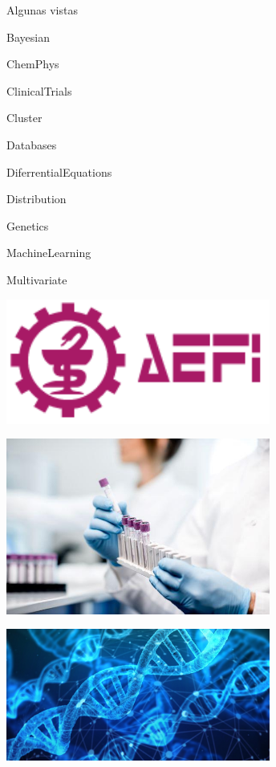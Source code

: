 \documentclass[xcolor=table]{beamer}
\begin{document}
\begin{frame}{Algunas vistas}

\begin{itemize}
\begin{minipage}{0.45\textwidth}
\item Bayesian
\item ChemPhys
\item ClinicalTrials
\item Cluster
\item Databases
\item DiferrentialEquations
\item Distribution
\item Genetics
\item MachineLearning
\item Multivariate
\end{minipage}
\begin{minipage}{0.45\textwidth}
\begin{minipage}{\textwidth}
\includegraphics[width=0.65\textwidth]{aefi.png}
\vspace{1cm}
\end{minipage}
\begin{minipage}{\textwidth}
\includegraphics[width=0.65\textwidth]{ensayo.jpg}
\vspace{1cm}
\end{minipage}
\begin{minipage}{\textwidth}
\includegraphics[width=0.65\textwidth]{genetica.jpg}
\end{minipage}
\end{minipage}
\end{itemize}
\end{frame}
\end{document}
